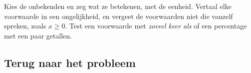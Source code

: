 \begin{werkwijze}
Kies de onbekenden en zeg wat ze betekenen, met de eenheid. Vertaal elke voorwaarde in een ongelijkheid, en vergeet de voorwaarden niet die vanzelf spreken, zoals $x \geqslant 0$. Test een voorwaarde met \textit{zoveel keer als} of een percentage met een paar getallen.
\end{werkwijze}


\begin{oefeningen}
\end{oefeningen}

\subsection{Terug naar het probleem}

